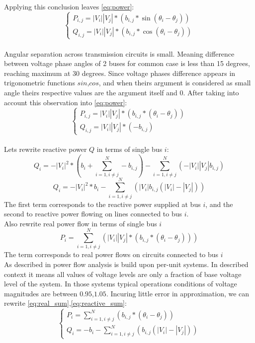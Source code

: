 \documentclass[twoside]{iisthesis}
\begin{document}
 Applying this conclusion leaves \eqref{eq:power}:
	\[\begin{cases}
		P_{i,j}=|V_i||V_j|*( b_{i,j}*\sin(\theta_i - \theta_j)) \\
		Q_{i,j}=|V_i||V_j|*( b_{i,j}*\cos(\theta_i - \theta_j))
	\end{cases}\]
\\
Angular separation across transmission circuits is small. Meaning difference between voltage phase angles of 2 buses for common case is less than 15 degrees, reaching maximum at 30 degrees. Since voltage phases difference appears in trigonometric functions \(sin\),\(cos\), and when theirs argument is considered as small angle theirs respective values are the argument itself and \(0\). After taking into account this observation into \eqref{eq:power}:
	\[\begin{cases}
	P_{i,j}=|V_i||V_j|*( b_{i,j}*(\theta_i - \theta_j)) \\
	Q_{i,j}=|V_i||V_j|*( -b_{i,j})
	\end{cases}\]
	\\
Lets rewrite reactive power \(Q\) in terms of single bus \(i\):
	\[
	Q_{i}=-|V_i|^2 * (b_{i} + \sum_{i=1,i\neq j}^{N}-b_{i,j})-\sum_{i=1,i\neq j}^{N}(-|V_i||V_j|b_{i,j})	
    \]
	\begin{equation}\label{eq:reactive_sum}
	Q_{i}=-|V_i|^2 * b_{i} - \sum_{i=1,i\neq j}^{N}(|V_i|b_{i,j}(|V_i|-|V_j|))
	\end{equation}
The first term corresponds to the reactive power supplied at bus \(i\), and the second to reactive power flowing on lines connected to bus \(i\).\\
Also rewrite real power flow in terms of single bus \(i\)
	\begin{equation}\label{eq:real_sum}
	P_{i}=\sum_{i=1,i \neq j}^N(|V_i||V_j|*( b_{i,j}*(\theta_i - \theta_j))) 
	\end{equation}
The term corresponds to real power flows on circuits connected to bus \(i\)\\
As described in \cite{Graigner1994} power flow analysis is build upon per-unit systems. In described context it means all values of voltage levels are only a fraction of base voltage level of the system. In those systems typical operations conditions of voltage magnitudes are between \(0.95\),\(1.05\). Incuring little error in approximation, we can rewrite \eqref{eq:real_sum},\eqref{eq:reactive_sum}:
	\[\begin{cases}
	P_{i}=\sum_{i=1,i \neq j}^N( b_{i,j}*(\theta_i - \theta_j)) \\
	Q_{i}=-b_{i} - \sum_{i=1,i\neq j}^{N}(b_{i,j}(|V_i|-|V_j|))
	\end{cases}\]
\end{document}
